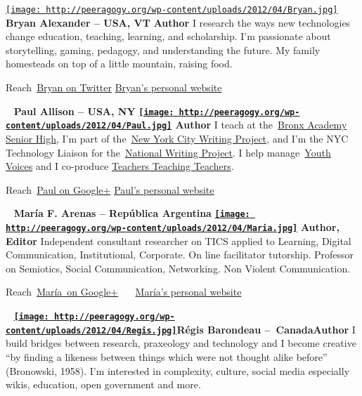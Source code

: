 \href{http://peeragogy.org/wp-content/uploads/2012/04/Bryan.jpg}{\texttt{[image: http://peeragogy.org/wp-content/uploads/2012/04/Bryan.jpg]}} \textbf{Bryan
Alexander -- USA, VT} \textbf{Author} I research the ways new
technologies change education, teaching, learning, and scholarship. I'm
passionate about storytelling, gaming, pedagogy, and understanding the
future. My family homesteads on top of a little mountain, raising food.

Reach~\href{https://twitter.com/\#!/BryanAlexander}{Bryan on Twitter}
\textbar{} \href{http://bryanalexander.org/}{Bryan's personal website}

~ \textbf{Paul Allison -- USA,
NY} \textbf{\href{http://peeragogy.org/wp-content/uploads/2012/04/Paul.jpg}{\texttt{[image: http://peeragogy.org/wp-content/uploads/2012/04/Paul.jpg]}}
Author} I teach at the~\href{http://bronxbash.com}{Bronx Academy Senior
High}, I'm part of the~\href{http://nycwritingproject.org}{New York City
Writing Project}, and I'm the NYC Technology Liaison for
the~\href{http://nwp.org}{National Writing Project}. I help
manage~\href{http://youthvoices.net/}{Youth Voices} and I co-produce
\href{http://teachersteachingteachers.org}{Teachers Teaching Teachers}.

Reach~\href{https://plus.google.com/u/0/113993022447291199374/about}{Paul
on Google+} \textbar{} \href{http://teachersteachingteachers.org}{Paul's
personal website}

~ \textbf{María F. Arenas -- República
Argentina} \textbf{\href{http://peeragogy.org/wp-content/uploads/2012/04/Maria.jpg}{\texttt{[image: http://peeragogy.org/wp-content/uploads/2012/04/Maria.jpg]}}}
\textbf{Author, Editor} Independent consultant researcher on TICS
applied to Learning, Digital Communication, Institutional, Corporate. On
line facilitator tutorship. Professor on Semiotics, Social
Communication, Networking. Non Violent Communication.

Reach~\href{https://plus.google.com/u/0/stream/circles/p2e54657d0d6fc86d}{María~on
Google+} ~\textbar{}
\textbf{~}\href{http://arenastudies.wordpress.com/}{María's personal
website}

~
\textbf{\href{http://peeragogy.org/wp-content/uploads/2012/04/Regis.jpg}{\texttt{[image: http://peeragogy.org/wp-content/uploads/2012/04/Regis.jpg]}}Régis
Barondeau --~Canada}\textbf{Author} I build bridges between research,
praxeology and technology and I become creative ``by finding a likeness
between things which were not thought alike before'' (Bronowski, 1958).
I'm interested in complexity, culture, social media especially wikis,
education, open government and more.

